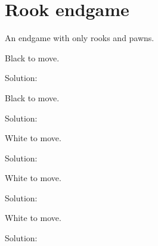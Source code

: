 \documentclass{book}
\begin{document}
\section{Rook endgame}
An endgame with only rooks and pawns.\begin{multicols}{2} 
\begin{samepage} 
\newgame 


 
\showboard
 
 Black to move. 
 
Solution: 
 
\end{samepage}\begin{samepage} 
\newgame 


 
\showboard
 
 Black to move. 
 
Solution: 
 
\end{samepage}\begin{samepage} 
\newgame 


 
\showboard
 
 White to move. 
 
Solution: 
 
\end{samepage}\begin{samepage} 
\newgame 


 
\showboard
 
 White to move. 
 
Solution: 
 
\end{samepage}\begin{samepage} 
\newgame 


 
\showboard
 
 White to move. 
 
Solution: 
 
\end{samepage}\begin{samepage} 
\newgame 


\end{samepage}
\end{multicols}
\end{document}
